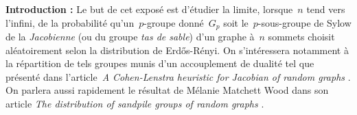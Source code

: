 \vspace*{0.3cm}
\begin{center}
\begin{minipage}{0.85\textwidth}
	\textbf{Introduction :}
	Le but de cet exposé est d'étudier la limite, lorsque~$n$ tend vers l'infini, de la probabilité qu'un~$p$-groupe donné~$G_p$ soit le~$p$-sous-groupe de Sylow de la \emph{Jacobienne} (ou du groupe \emph{tas de sable}) d'un graphe à~$n$ sommets choisit aléatoirement selon la distribution de Erd\H{o}s-Rényi. On s'intéressera notamment à la répartition de tels groupes munis d'un accouplement de dualité tel que présenté dans l'article~\emph{A Cohen-Lenstra heuristic for Jacobian of random graphs} \cite{new}. On parlera aussi rapidement le résultat de Mélanie Matchett Wood dans son article \emph{The distribution of sandpile groups of random graphs} \cite{main}.
\end{minipage}
\end{center}
